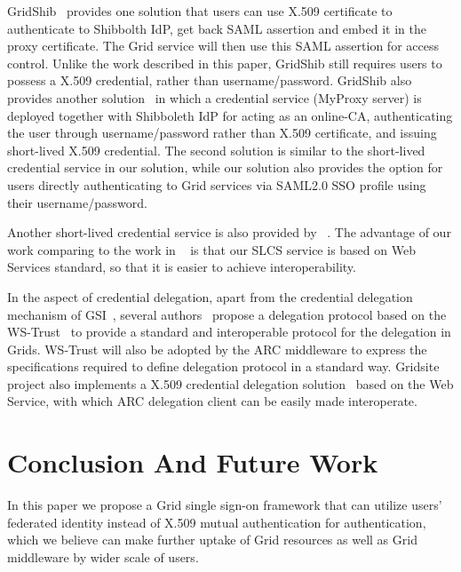 \documentclass[conference]{IEEEtran}
\begin{document}
GridShib~\cite{T.Scavo07,VWelch05} provides one solution that users can use X.509 
certificate to authenticate to Shibbolth IdP, get back SAML assertion and embed it in 
the proxy certificate. The Grid service will then use this SAML assertion for access control.
Unlike the work described in this paper, GridShib still requires users to possess a X.509 
credential, rather than username/password. GridShib also provides another 
solution~\cite{TBarton06} in which a credential service (MyProxy server) is deployed together
with Shibboleth IdP for acting as an online-CA, authenticating the user through username/password
rather than X.509 certificate, and issuing short-lived X.509 credential. The second solution
is similar to the short-lived credential service in our solution, while our solution
also provides the option for users directly authenticating to Grid services via SAML2.0 SSO 
profile using their username/password.

Another short-lived credential service is also provided by ~\cite{switchslcslink}. 
The advantage of our work comparing to the work in ~\cite{switchslcslink} is that 
our SLCS service is based on Web Services standard, so that it is easier to achieve 
interoperability.

In the aspect of credential delegation, apart from the credential delegation mechanism of 
GSI~\cite{IFoster98,VWelch04}, several authors~\cite{MAhsant04} propose a delegation protocol 
based on the WS-Trust~\cite{WSTrustlink} to provide a standard and interoperable protocol 
for the delegation in Grids. WS-Trust will also be adopted by the ARC middleware to express the 
specifications required to define delegation protocol in a standard way. Gridsite project also
implements a X.509 credential delegation solution~\cite{GridSitelink} based on the Web 
Service, with which ARC delegation client can be easily made interoperate.

\section{Conclusion And Future Work}
\label{sec:conclusion}
In this paper we propose a Grid single sign-on framework that can utilize users' 
federated identity instead of X.509 mutual authentication for authentication, which
we believe can make further uptake of Grid resources as well as Grid middleware by 
wider scale of users.
\end{document}
